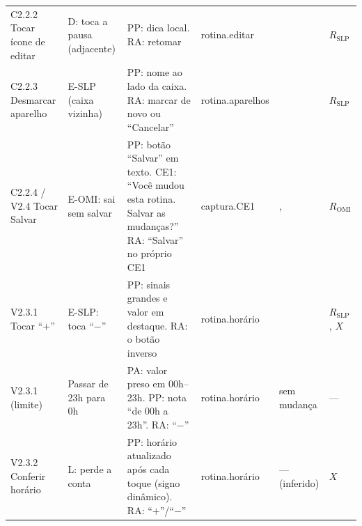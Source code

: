 \begin{tabularx}{\textwidth}{@{}P{2.3cm}P{2.3cm}YP{2.0cm}P{2.3cm}P{1.3cm}@{}}
C2.2.2 Tocar ícone de editar & D: toca a pausa (adjacente) & PP: dica local. RA: retomar & rotina.editar &  & $R_{\mathrm{SLP}}$ \\
C2.2.3 Desmarcar aparelho & E-SLP (caixa vizinha) & PP: nome ao lado da caixa. RA: marcar de novo ou ``Cancelar'' & rotina.aparelhos &  & $R_{\mathrm{SLP}}$ \\
C2.2.4 / V2.4 Tocar Salvar & E-OMI: sai sem salvar & PP: botão ``Salvar'' em texto. CE1: ``Você mudou esta rotina. Salvar as mudanças?'' RA: ``Salvar'' no próprio CE1 & captura.CE1 & ,  & $R_{\mathrm{OMI}}$ \\
V2.3.1 Tocar ``$+$'' & E-SLP: toca ``$-$'' & PP: sinais grandes e valor em destaque. RA: o botão inverso & rotina.horário &  & $R_{\mathrm{SLP}}$, $X$ \\
V2.3.1 (limite) & Passar de 23h para 0h & PA: valor preso em 00h--23h. PP: nota ``de 00h a 23h''. RA: ``$-$'' & rotina.horário &  sem mudança & --- \\
V2.3.2 Conferir horário & L: perde a conta & PP: horário atualizado após cada toque (signo dinâmico). RA: ``$+$''/``$-$'' & rotina.horário & --- (inferido) & $X$ \\
\bottomrule
\end{tabularx}
